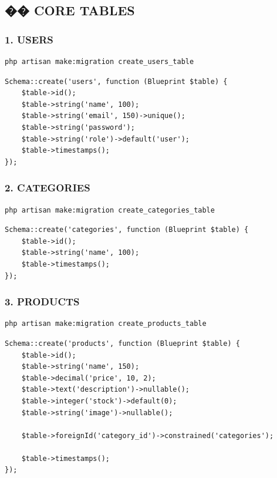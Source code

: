 \documentclass[12pt,a4paper]{article}
\begin{document}
\subsection{�� CORE TABLES}

\subsubsection{1. USERS}
\begin{verbatim}
php artisan make:migration create_users_table
\end{verbatim}

\begin{verbatim}
Schema::create('users', function (Blueprint $table) {
    $table->id();
    $table->string('name', 100);
    $table->string('email', 150)->unique();
    $table->string('password');
    $table->string('role')->default('user');
    $table->timestamps();
});
\end{verbatim}

\subsubsection{2. CATEGORIES}
\begin{verbatim}
php artisan make:migration create_categories_table
\end{verbatim}

\begin{verbatim}
Schema::create('categories', function (Blueprint $table) {
    $table->id();
    $table->string('name', 100);
    $table->timestamps();
});
\end{verbatim}

\subsubsection{3. PRODUCTS}
\begin{verbatim}
php artisan make:migration create_products_table
\end{verbatim}

\begin{verbatim}
Schema::create('products', function (Blueprint $table) {
    $table->id();
    $table->string('name', 150);
    $table->decimal('price', 10, 2);
    $table->text('description')->nullable();
    $table->integer('stock')->default(0);
    $table->string('image')->nullable();

    $table->foreignId('category_id')->constrained('categories');

    $table->timestamps();
});
\end{verbatim}
\end{document}
